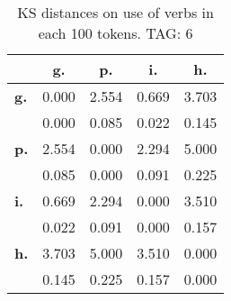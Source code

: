 \begin{table}[h!]
\begin{center}
\begin{tabular}{| l || c | c | c | c |}\hline
 & {\bf g.} & {\bf p.} & {\bf i.} & {\bf h.} \\\hline\hline
{\bf g.} & 0.000 & 2.554 & 0.669 & 3.703 \\
{\bf } & 0.000 & 0.085 & 0.022 & 0.145 \\\hline
{\bf p.} & 2.554 & 0.000 & 2.294 & 5.000 \\
{\bf } & 0.085 & 0.000 & 0.091 & 0.225 \\\hline
{\bf i.} & 0.669 & 2.294 & 0.000 & 3.510 \\
{\bf } & 0.022 & 0.091 & 0.000 & 0.157 \\\hline
{\bf h.} & 3.703 & 5.000 & 3.510 & 0.000 \\
{\bf } & 0.145 & 0.225 & 0.157 & 0.000 \\\hline
\end{tabular}
\caption{KS distances on use of verbs in each 100 tokens. TAG: 6}
\end{center}
\end{table}